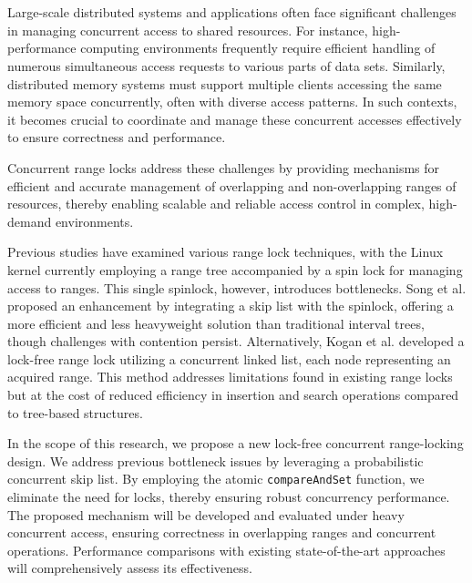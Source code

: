 \chapter{\abstractname}

Large-scale distributed systems and applications often face significant challenges in managing concurrent access to shared resources. For instance, high-performance computing environments frequently require efficient handling of numerous simultaneous access requests to various parts of data sets. Similarly, distributed memory systems must support multiple clients accessing the same memory space concurrently, often with diverse access patterns. In such contexts, it becomes crucial to coordinate and manage these concurrent accesses effectively to ensure correctness and performance. 

Concurrent range locks address these challenges by providing mechanisms for efficient and accurate management of overlapping and non-overlapping ranges of resources, thereby enabling scalable and reliable access control in complex, high-demand environments.

Previous studies have examined various range lock techniques, with the Linux kernel currently employing a range tree accompanied by a spin lock for managing access to ranges. This single spinlock, however, introduces bottlenecks. Song et al. proposed an enhancement by integrating a skip list with the spinlock, offering a more efficient and less heavyweight solution than traditional interval trees, though challenges with contention persist. Alternatively, Kogan et al. developed a lock-free range lock utilizing a concurrent linked list, each node representing an acquired range. This method addresses limitations found in existing range locks but at the cost of reduced efficiency in insertion and search operations compared to tree-based structures.

In the scope of this research, we propose a new lock-free concurrent range-locking design. We address previous bottleneck issues by leveraging a probabilistic concurrent skip list. By employing the atomic \texttt{compareAndSet} function, we eliminate the need for locks, thereby ensuring robust concurrency performance. The proposed mechanism will be developed and evaluated under heavy concurrent access, ensuring correctness in overlapping ranges and concurrent operations. Performance comparisons with existing state-of-the-art approaches will comprehensively assess its effectiveness.